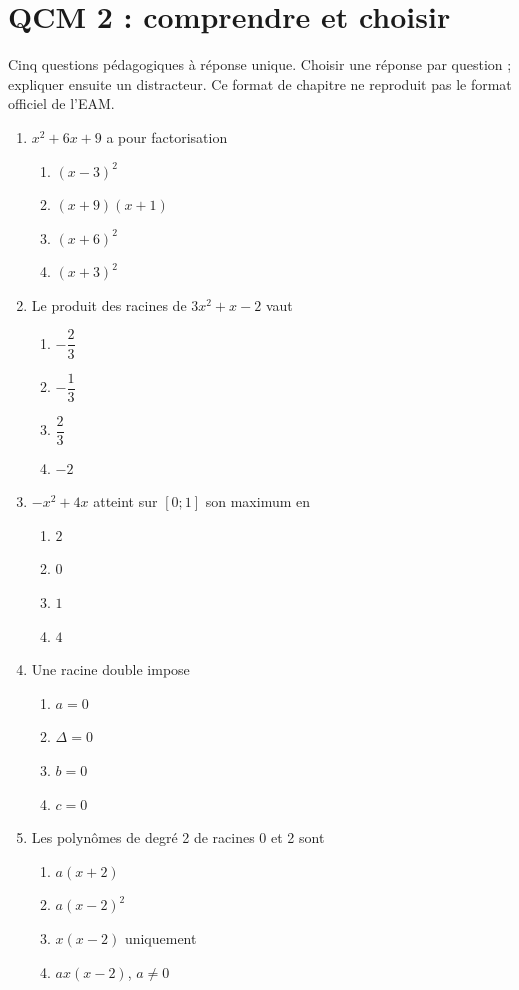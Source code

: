 \endgroup
\begingroup\small
{}\section*{QCM 2 : comprendre et choisir}\label{C02-Q2}
Cinq questions pédagogiques à réponse unique. Choisir une réponse par question ; expliquer ensuite un distracteur. Ce format de chapitre ne reproduit pas le format officiel de l’EAM.
\begin{enumerate}
\item $x^2+6x+9$ a pour factorisation
\begin{enumerate}[label=\Alph*.,itemsep=2pt]
\item $(x-3)^2$
\item $(x+9)(x+1)$
\item $(x+6)^2$
\item $(x+3)^2$
\end{enumerate}
\item Le produit des racines de $3x^2+x-2$ vaut
\begin{enumerate}[label=\Alph*.,itemsep=2pt]
\item $-\dfrac{2}{3}$
\item $-\dfrac{1}{3}$
\item $\dfrac{2}{3}$
\item $-2$
\end{enumerate}
\item $-x^2+4x$ atteint sur $[0;1]$ son maximum en
\begin{enumerate}[label=\Alph*.,itemsep=2pt]
\item $2$
\item $0$
\item $1$
\item $4$
\end{enumerate}
\item Une racine double impose
\begin{enumerate}[label=\Alph*.,itemsep=2pt]
\item $a=0$
\item $\Delta=0$
\item $b=0$
\item $c=0$
\end{enumerate}
\item Les polynômes de degré 2 de racines 0 et 2 sont
\begin{enumerate}[label=\Alph*.,itemsep=2pt]
\item $a(x+2)$
\item $a(x-2)^2$
\item $x(x-2)$ uniquement
\item $ax(x-2)$, $a\ne0$
\end{enumerate}
\end{enumerate}
